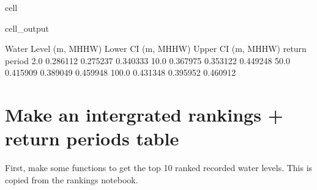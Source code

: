 \documentclass[letterpaper,10pt,english]{jupyterBook}
\begin{document}
\begin{sphinxuseclass}{cell}
\begin{sphinxVerbatimOutput}
\begin{sphinxuseclass}{cell_output}
\begin{sphinxVerbatim}[commandchars=\\\{\}]
               Water Level (m, MHHW)  Lower CI (m, MHHW)  Upper CI (m, MHHW)
return period                                                               
2.0                         0.286112            0.275237            0.340333
10.0                        0.367975            0.353122            0.449248
50.0                        0.415909            0.389049            0.459948
100.0                       0.431348            0.395952            0.460912
\end{sphinxVerbatim}

\end{sphinxuseclass}\end{sphinxVerbatimOutput}

\end{sphinxuseclass}

\chapter{Make an intergrated rankings + return periods table}
\label{\detokenize{notebooks/regional_and_local/SL_Extremes_annual:make-an-intergrated-rankings-return-periods-table}}
\sphinxAtStartPar
First, make some functions to get the top 10 ranked recorded water levels. This is copied from the rankings notebook.
\end{document}
